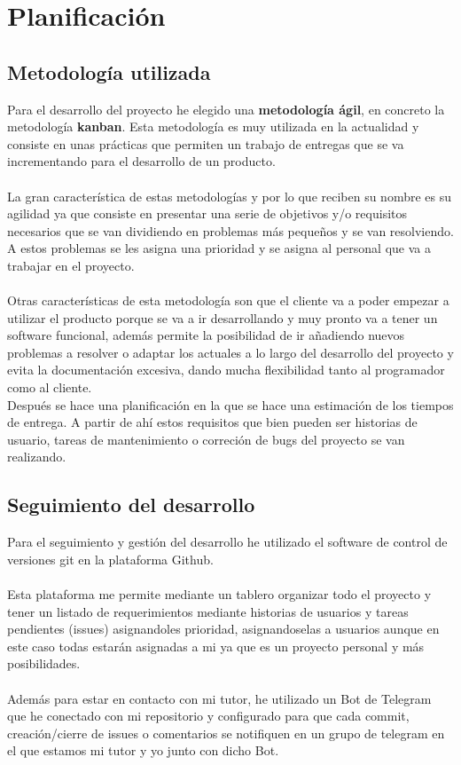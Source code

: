 \chapter{Planificación}

\section{Metodología utilizada}
Para el desarrollo del proyecto he elegido una \textbf{metodología ágil}, en concreto la metodología \textbf{kanban}.
Esta metodología es muy utilizada en la actualidad y consiste en unas prácticas que permiten un trabajo de entregas que se va incrementando para el desarrollo de un producto. \\\\
La gran característica de estas metodologías y por lo que reciben su nombre es su agilidad ya que consiste en presentar una serie de objetivos y/o requisitos necesarios que se van dividiendo en problemas más pequeños 
y se van resolviendo. A estos problemas se les asigna una prioridad y se asigna al personal que va a trabajar en el proyecto.\\\\
Otras características de esta metodología son que el cliente va a poder empezar a utilizar el producto porque se va a ir desarrollando y muy pronto va a tener un software funcional, 
además permite la posibilidad de ir añadiendo nuevos problemas a resolver o adaptar los actuales a lo largo del desarrollo del proyecto y evita la documentación excesiva, dando mucha flexibilidad tanto al programador como al cliente.\\

Después se hace una planificación en la que se hace una estimación de los tiempos de entrega.
A partir de ahí estos requisitos que bien pueden ser historias de usuario, tareas de mantenimiento o correción de bugs del proyecto se van realizando.
 
\newpage
\section{Seguimiento del desarrollo}

Para el seguimiento y gestión del desarrollo he utilizado el software de control de versiones
git\cite{git} en la plataforma Github\cite{Github}.\\\\
Esta plataforma me permite mediante un tablero organizar todo el proyecto
y tener un listado de requerimientos mediante historias de usuarios y tareas pendientes (issues) asignandoles
prioridad, asignandoselas a usuarios aunque en este caso todas estarán asignadas a mi ya que es un proyecto personal 
y más posibilidades.\\\\
Además para estar en contacto con mi tutor, he utilizado un Bot de Telegram que he conectado con mi repositorio y 
configurado para que cada commit, creación/cierre de issues o comentarios se notifiquen en un grupo de telegram en el que estamos mi tutor y yo
junto con dicho Bot.\\

